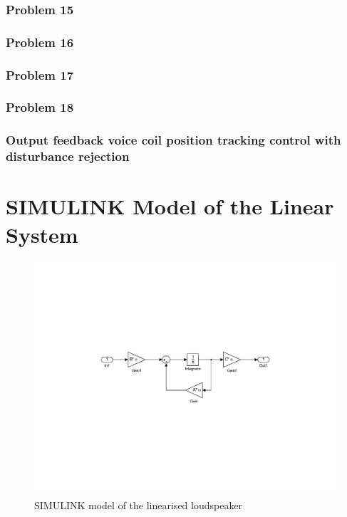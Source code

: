 \documentclass[11pt,a4paper,fleqn, onesside]{report}
\begin{document}
\subsection*{Problem 15}


\subsection*{Problem 16}


\subsection*{Problem 17}


\subsection*{Problem 18}


\subsection{Output feedback voice coil position tracking control with disturbance rejection}


\appendix
\chapter{SIMULINK Model of the Linear System}
\label{AppLinearModelP9}
\begin{figure}[H]
 \centering 
 \includegraphics[trim=5cm 7cm 2cm 7cm, clip=true, totalheight=0.25\textheight, angle=0]{figures/linearModelMatrix.pdf}
 \caption{SIMULINK model of the linearised loudspeaker}
\label{fig:linearModelMatrix}
\end{figure}
\end{document}

